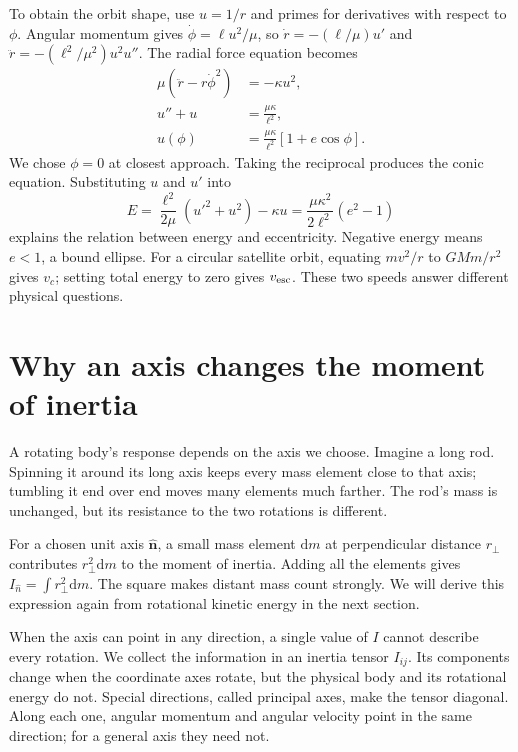 \documentclass[11pt,oneside]{book}
\newcommand{\dd}{\mathrm{d}}
\newcommand{\vect}[1]{\boldsymbol{#1}}
\theoremstyle{reviewstyle}
\begin{document}
To obtain the orbit shape, use $u=1/r$ and primes for derivatives with respect to $\phi$. Angular momentum gives $\dot\phi=\ell u^2/\mu$, so $\dot r=-(\ell/\mu)u'$ and $\ddot r=-(\ell^2/\mu^2)u^2u''$. The radial force equation becomes
\begin{align}
\mu(\ddot r-r\dot\phi^2)&=-\kappa u^2,\\
u''+u&=\frac{\mu\kappa}{\ell^2},\\
u(\phi)&=\frac{\mu\kappa}{\ell^2}[1+e\cos\phi].
\end{align}
We chose $\phi=0$ at closest approach. Taking the reciprocal produces the conic equation. Substituting $u$ and $u'$ into
\begin{equation}
E=\frac{\ell^2}{2\mu}(u'^2+u^2)-\kappa u
=\frac{\mu\kappa^2}{2\ell^2}(e^2-1)
\end{equation}
explains the relation between energy and eccentricity. Negative energy means $e<1$, a bound ellipse. For a circular satellite orbit, equating $mv^2/r$ to $GMm/r^2$ gives $v_c$; setting total energy to zero gives $v_{\rm esc}$. These two speeds answer different physical questions.

\section{Why an axis changes the moment of inertia}
A rotating body's response depends on the axis we choose. Imagine a long rod. Spinning it around its long axis keeps every mass element close to that axis; tumbling it end over end moves many elements much farther. The rod's mass is unchanged, but its resistance to the two rotations is different.

For a chosen unit axis $\hat{\vect n}$, a small mass element $\dd m$ at perpendicular distance $r_\perp$ contributes $r_\perp^2\dd m$ to the moment of inertia. Adding all the elements gives $I_{\hat n}=\int r_\perp^2\dd m$. The square makes distant mass count strongly. We will derive this expression again from rotational kinetic energy in the next section.

When the axis can point in any direction, a single value of $I$ cannot describe every rotation. We collect the information in an inertia tensor $I_{ij}$. Its components change when the coordinate axes rotate, but the physical body and its rotational energy do not. Special directions, called principal axes, make the tensor diagonal. Along each one, angular momentum and angular velocity point in the same direction; for a general axis they need not.
\end{document}
